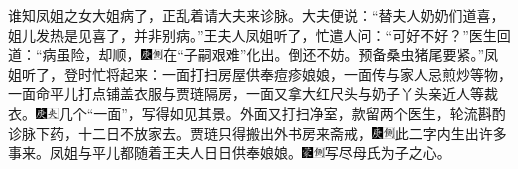 {谁知凤姐之女大姐病了，正乱着请大夫来诊脉。大夫便说：``替夫人奶奶们道喜，姐儿发热是见喜了，并非别病。''王夫人凤姐听了，忙遣人问：``可好不好？''医生回道：``病虽险，却顺，{\includegraphics[width=3mm]{../Images/00004}\includegraphics[width=3mm]{../Images/00011}\footnotesize \kaishu 在``子嗣艰难''化出。}倒还不妨。预备桑虫猪尾要紧。''凤姐听了，登时忙将起来：一面打扫房屋供奉痘疹娘娘，一面传与家人忌煎炒等物，一面命平儿打点铺盖衣服与贾琏隔房，一面又拿大红尺头与奶子丫头亲近人等裁衣。{\includegraphics[width=3mm]{../Images/00004}\includegraphics[width=3mm]{../Images/00012}\footnotesize \kaishu 几个``一面''，写得如见其景。}外面又打扫净室，款留两个医生，轮流斟酌诊脉下药，十二日不放家去。贾琏只得搬出外书房来斋戒，{\includegraphics[width=3mm]{../Images/00004}\includegraphics[width=3mm]{../Images/00011}\footnotesize \kaishu 此二字内生出许多事来。}凤姐与平儿都随着王夫人日日供奉娘娘。{\includegraphics[width=3mm]{../Images/00006}\includegraphics[width=3mm]{../Images/00011}\footnotesize \kaishu 写尽母氏为子之心。}

}
